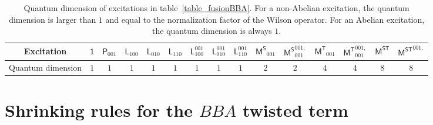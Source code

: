 \documentclass[11pt,nofootinbib,preprint]{revtex4-1}
\begin{document}
\begin{table}
	\caption{\label{table_quantumdBBA}Quantum dimension of excitations in table~\ref{table_fusionBBA}. For a non-Abelian excitation, the quantum dimension is larger than $1$ and equal to the normalization factor of the Wilson operator. For an Abelian excitation, the quantum dimension is always $1$. }
	\centering
	\footnotesize
	\begin{tabular*}{\textwidth}{@{\extracolsep{\fill}}ccccccccccccccc}
		\toprule
		Excitation & $\mathsf{1}$ & $\mathsf{P}_{001}$ & $\mathsf{L}_{100}$ & $\mathsf{L}_{010}$ & $\mathsf{L}_{110}$ & $\mathsf{L}_{100}^{001}$ & $\mathsf{L}_{010}^{001}$ & $\mathsf{L}_{110}^{001}$ & $\mathsf{M^S}_{001}$ & $\mathsf{M^S}_{001}^{001,}$ & $\mathsf{M^T}_{001}$ & $\mathsf{M^T}_{001}^{001,}$ & $\mathsf{M^{ST}}$ & $\mathsf{M^{ST}}^{001,}$ \\
		\hline
		Quantum dimension & $1$ & $1$ & $1$ & $1$ & $1$ & $1$ & $1$ & $1$ & $2$ & $2$ & $4$ & $4$ & $8$ & $8$ \\
		\bottomrule
	\end{tabular*}
\end{table}


 
\section{Shrinking rules for the $BBA$ twisted term\label{s4}}
\end{document}
